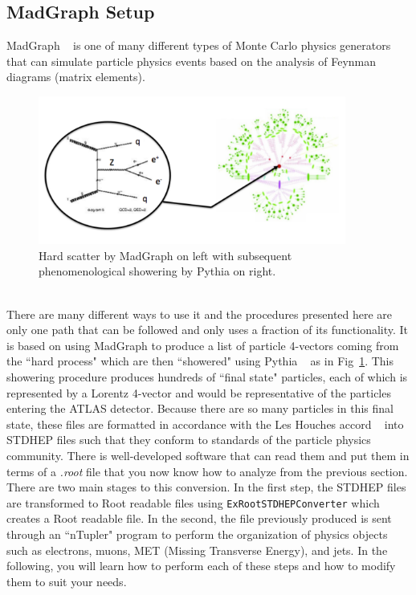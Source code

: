 \documentclass[12pt]{article}
\begin{document}
\subsection{MadGraph Setup}
MadGraph ~\cite{madgraph} is one of many different types of Monte Carlo physics generators that can simulate particle physics events based on the analysis of Feynman diagrams (matrix elements).  
\\
\begin{figure}[htp]
\centering
\includegraphics[width=0.9\textwidth]{scatter.pdf}
\caption{Hard scatter by MadGraph on left with subsequent phenomenological showering by Pythia on right.}
  \label{fig:scatter}
\end{figure}
\\
There are many different ways to use it and the procedures presented here are only one path that can be followed and only uses a fraction of its functionality.  It is based on using MadGraph to produce a list of particle 4-vectors coming from the ``hard process" which are then  ``showered" using Pythia ~\cite{pythia} as in Fig~\ref{fig:scatter}.  This showering procedure produces hundreds of ``final state" particles, each of which is represented by a Lorentz 4-vector and would be representative of the particles entering the ATLAS detector.  Because there are so many particles in this final state, these files are formatted in accordance with the Les Houches accord ~\cite{leshouches} into STDHEP files such that they conform to standards of the particle physics community.  There is well-developed software that can read them and put them in terms of a \textit{.root} file that you now know how to analyze from the previous section.  There are two main stages to this conversion.  In the first step, the STDHEP files are transformed to Root readable files using \texttt{ExRootSTDHEPConverter} which creates a Root readable file.  In the second, the file previously produced is sent through an ``nTupler" program to perform the organization of physics objects such as electrons, muons, MET (Missing Transverse Energy), and jets.  In the following, you will learn how to perform each of these steps and how to modify them to suit your needs.
\end{document}
